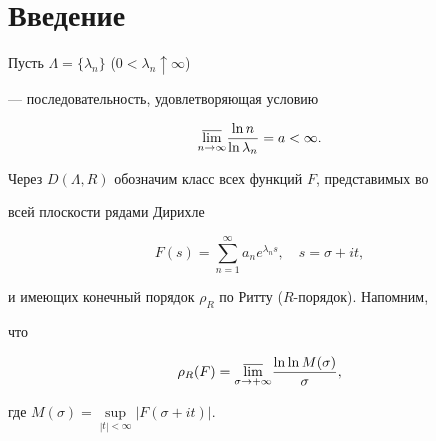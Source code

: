 \pagestyle{plain} %







\maketitle


\label{begin}











\section{Введение}





Пусть $\Lambda=\{\lambda_n \}$ ($0<\lambda_n \uparrow \infty$)


--- последовательность, удовлетворяющая условию


\begin{equation}\label{f1}


\underset{n\to\infty}{\varlimsup}{} \frac{\ln n}{\ln \lambda_n}=a< \infty.


\end{equation}


Через $D(\Lambda,R)$ обозначим класс всех функций $F$, представимых во


всей плоскости рядами Дирихле


\begin{equation}\label{f2}


F(s)=\sum_{n=1}^{\infty}a_{n}e^{\lambda_{n}s},\quad s=\sigma+it,


\end{equation}


и имеющих конечный порядок $\rho_{R}$ по Ритту ($R$-порядок). Напомним,


что \cite{lit1}


$$


\rho_{R}(F)=\underset{\sigma\to +\infty}{\varlimsup}{}


\frac{\ln\ln M(\sigma)}{\sigma},


$$


где $M(\sigma)=\sup\limits_{|t|<\infty}|F(\sigma+it)|$.





